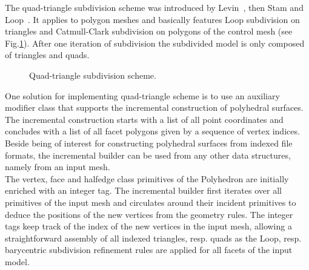 


The quad-triangle subdivision scheme was introduced by
Levin~\cite{l-pg-03}, then Stam and Loop~\cite{qts}. It applies to
polygon meshes and basically features Loop subdivision on triangles
and Catmull-Clark subdivision on polygons of the control mesh (see
Fig.\ref{fig:quad-triangle}). After one iteration of subdivision the
subdivided model is only composed of triangles and quads.

\begin{figure}
    \caption{Quad-triangle subdivision scheme.}
    \label{fig:quad-triangle}
\end{figure}

One solution for implementing quad-triangle scheme is to use an
auxiliary modifier class that supports the incremental construction of
polyhedral surfaces. The incremental construction starts with a list
of all point coordinates and concludes with a list of all facet
polygons given by a sequence of vertex indices.  Beside being of
interest for constructing polyhedral surfaces from indexed file
formats, the incremental builder can be used from any other data
structures, namely from an input mesh.\\

The vertex, face and halfedge class primitives of the Polyhedron are
initially enriched with an integer tag. The incremental builder first
iterates over all primitives of the input mesh and circulates around
their incident primitives to deduce the positions of the new vertices
from the geometry rules. The integer tags keep track of the index of
the new vertices in the input mesh, allowing a straightforward assembly
of all indexed triangles, resp. quads as the Loop, resp. barycentric
subdivision refinement rules are applied for all facets of the input
model.

